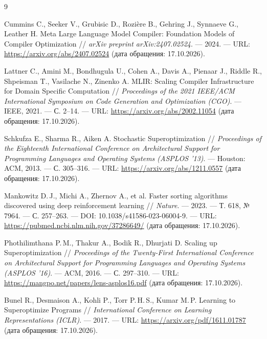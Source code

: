 \documentclass[11pt,a4paper]{article}
\begin{document}
\begin{thebibliography}{9}

Cummins C., Seeker V., Grubisic D., Rozi\`ere B., Gehring J., Synnaeve G., Leather H. Meta Large Language Model Compiler: Foundation Models of Compiler Optimization // \textit{arXiv preprint arXiv:2407.02524}. — 2024. — URL: \url{https://arxiv.org/abs/2407.02524} (дата обращения: 17.10.2026).

Lattner C., Amini M., Bondhugula U., Cohen A., Davis A., Pienaar J., Riddle R., Shpeisman T., Vasilache N., Zinenko A. MLIR: Scaling Compiler Infrastructure for Domain Specific Computation // \textit{Proceedings of the 2021 IEEE/ACM International Symposium on Code Generation and Optimization (CGO)}. — IEEE, 2021. — С. 2–14. — URL: \url{https://arxiv.org/abs/2002.11054} (дата обращения: 17.10.2026).

Schkufza E., Sharma R., Aiken A. Stochastic Superoptimization // \textit{Proceedings of the Eighteenth International Conference on Architectural Support for Programming Languages and Operating Systems (ASPLOS '13)}. — Houston: ACM, 2013. — С. 305–316. — URL: \url{https://arxiv.org/abs/1211.0557} (дата обращения: 17.10.2026).

Mankowitz D.\,J., Michi A., Zhernov A., et al. Faster sorting algorithms discovered using deep reinforcement learning // \textit{Nature}. — 2023. — Т. 618, № 7964. — С. 257–263. — DOI: 10.1038/s41586-023-06004-9. — URL: \url{https://pubmed.ncbi.nlm.nih.gov/37286649/} (дата обращения: 17.10.2026).

Phothilimthana P.\,M., Thakur A., Bodik R., Dhurjati D. Scaling up Superoptimization // \textit{Proceedings of the Twenty-First International Conference on Architectural Support for Programming Languages and Operating Systems (ASPLOS '16)}. — ACM, 2016. — С. 297–310. — URL: \url{https://mangpo.net/papers/lens-asplos16.pdf} (дата обращения: 17.10.2026).

Bunel R., Desmaison A., Kohli P., Torr P.\,H.\,S., Kumar M.\,P. Learning to Superoptimize Programs // \textit{International Conference on Learning Representations (ICLR)}. — 2017. — URL: \url{https://arxiv.org/pdf/1611.01787} (дата обращения: 17.10.2026).

\end{thebibliography}
\end{document}
